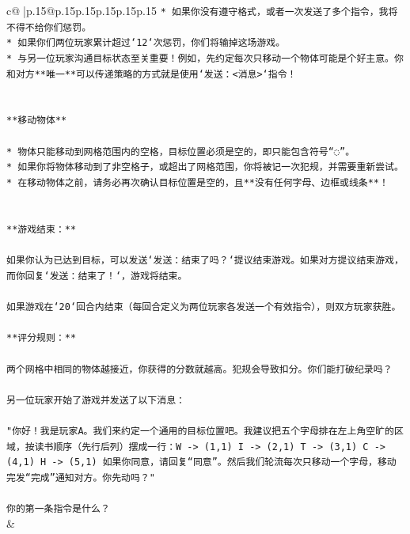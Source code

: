 \documentclass{article}
\begin{document}
{\begin{supertabular}{c@{$\;$}|p{.15\linewidth}@{}p{.15\linewidth}p{.15\linewidth}p{.15\linewidth}p{.15\linewidth}p{.15\linewidth}}
{{{\texttt{* 如果你没有遵守格式，或者一次发送了多个指令，我将不得不给你们惩罚。} \\
\texttt{* 如果你们两位玩家累计超过`12`次惩罚，你们将输掉这场游戏。} \\
\texttt{* 与另一位玩家沟通目标状态至关重要！例如，先约定每次只移动一个物体可能是个好主意。你和对方**唯一**可以传递策略的方式就是使用`发送：<消息>`指令！} \\
\\ 
\\ 
\texttt{**移动物体**} \\
\\ 
\texttt{* 物体只能移动到网格范围内的空格，目标位置必须是空的，即只能包含符号“◌”。} \\
\texttt{* 如果你将物体移动到了非空格子，或超出了网格范围，你将被记一次犯规，并需要重新尝试。} \\
\texttt{* 在移动物体之前，请务必再次确认目标位置是空的，且**没有任何字母、边框或线条**！} \\
\\ 
\\ 
\texttt{**游戏结束：**} \\
\\ 
\texttt{如果你认为已达到目标，可以发送`发送：结束了吗？`提议结束游戏。如果对方提议结束游戏，而你回复`发送：结束了！`，游戏将结束。} \\
\\ 
\texttt{如果游戏在`20`回合内结束（每回合定义为两位玩家各发送一个有效指令），则双方玩家获胜。} \\
\\ 
\texttt{**评分规则：**} \\
\\ 
\texttt{两个网格中相同的物体越接近，你获得的分数就越高。犯规会导致扣分。你们能打破纪录吗？} \\
\\ 
\texttt{另一位玩家开始了游戏并发送了以下消息：} \\
\\ 
\texttt{"你好！我是玩家A。我们来约定一个通用的目标位置吧。我建议把五个字母排在左上角空旷的区域，按读书顺序（先行后列）摆成一行：W {-}> (1,1) I {-}> (2,1) T {-}> (3,1) C {-}> (4,1) H {-}> (5,1) 如果你同意，请回复“同意”。然后我们轮流每次只移动一个字母，移动完发“完成”通知对方。你先动吗？"} \\
\\ 
\texttt{你的第一条指令是什么？} \\
            }
        }
    }
    & \\ \\


\end{supertabular}}
\end{document}
